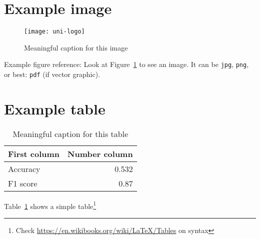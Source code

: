 \section{Example image}

\begin{figure}
	\centering
	\texttt{[image: uni-logo]}
	\caption{Meaningful caption for this image}
	\label{fig:uniLogo}
\end{figure}

Example figure reference: Look at Figure~\ref{fig:uniLogo} to see an image. It can be \texttt{jpg}, \texttt{png}, or best: \texttt{pdf} (if vector graphic).

\section{Example table}

\begin{table}
	\centering
	\begin{tabular}{lr}
		First column & Number column \\
		\hline
		Accuracy & 0.532 \\
		F1 score & 0.87
	\end{tabular}
	\caption{Meaningful caption for this table}
	\label{tab:result}
\end{table}

Table~\ref{tab:result} shows a simple table\footnote{Check \url{https://en.wikibooks.org/wiki/LaTeX/Tables} on syntax}